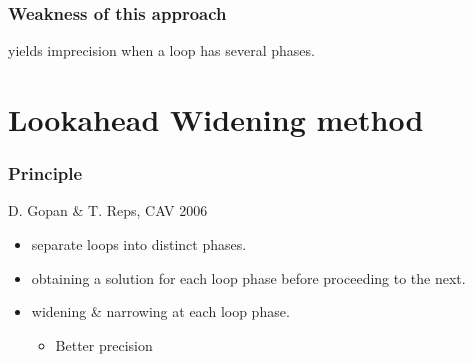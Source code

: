 \documentclass{beamer}
\begin{document}
\begin{frame}
\begin{columns}
\begin{column}{5cm}
\end{column}
\end{columns}
\end{frame}

\begin{frame}
  \frametitle{Weakness of this approach}
	\begin{center}
		yields imprecision when a loop has several phases.
	\end{center}
\end{frame}

\section[Lookahead Widening]{Lookahead Widening method}

\begin{frame}
  \frametitle{Principle}

D. Gopan \& T. Reps, CAV 2006
\bigskip
\begin{itemize}
\item separate loops into distinct phases.
\item obtaining a solution for each loop phase before proceeding to the next.
\item widening \& narrowing at each loop phase.
\begin{itemize}
\item Better precision
\end{itemize}
\end{itemize}
\end{frame}
\end{document}
